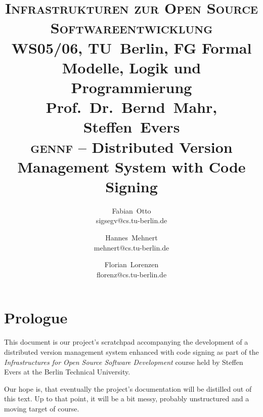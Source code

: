 \documentclass[fleqn, 10pt, a4paper]{article}
\newcommand{\GENNF}{\textsc{gennf}}
\begin{document}
\title{
  {\normalsize {\scshape Infrastrukturen zur Open
    Source Softwareentwicklung} \\
  WS05/06, TU~Berlin, FG Formal Modelle, Logik und Programmierung
  Prof.~Dr.~Bernd~Mahr, Steffen~Evers} \\
  \GENNF{} -- Distributed Version Management System with Code Signing}

\author{
  \begin{minipage}[t]{0.2\linewidth}
    \begin{center}
      {\small Fabian~Otto} \vspace{-3mm} \\
      {\tiny\ttfamily sigsegv@cs.tu-berlin.de}
    \end{center}
  \end{minipage}\and
  \begin{minipage}[t]{0.2\linewidth}
    \begin{center}
      {\small Hannes~Mehnert} \vspace{-8mm} \\
      {\tiny\ttfamily mehnert@cs.tu-berlin.de}
    \end{center}
  \end{minipage}\and
  \begin{minipage}[t]{0.2\linewidth}
    \begin{center}
      {\small Florian~Lorenzen} \vspace{-8mm} \\
      {\tiny\ttfamily florenz@cs.tu-berlin.de}
    \end{center}
  \end{minipage}}
\maketitle

\tableofcontents

\section{Prologue}
This document is our project's scratchpad accompanying the development
of a distributed version management system enhanced with code signing as
part of the \emph{Infrastructures for Open Source Software Development}
course held by Steffen Evers at the Berlin Technical University.

Our hope is, that eventually the project's documentation will be
distilled out of this text. Up to that point, it will be a bit messy,
probably unstructured and a moving target of course.
\end{document}
